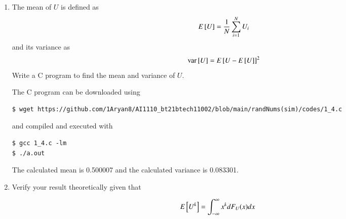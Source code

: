 \documentclass[journal,12pt,twocolumn]{IEEEtran}
\renewcommand\thesection{\arabic{section}}
\begin{document}
\begin{enumerate}[label=\thesection.\arabic*
,ref=\thesection.\theenumi]
\solution
The CDF of $U$ is given by
		\begin{align}
			F_U(x) = \pr{U \leq x} = \int_{-\infty}^{x}p_U(u)du
		\end{align}
We now have three cases:
		\begin{enumerate}
			\item $x < 0$: $p_X(x) = 0$, and hence $F_U(x) = 0$.
			\item $0 \leq x < 1$: Here,
				\begin{align}
					F_U(x) = \int_{0}^{x}du = x
					\label{eq:cdf-uni}
				\end{align}
			\item $x \geq 1$: Put $x = 1$ in \eqref{eq:cdf-uni} as $U$ is uniform in [0, 1] to get $F_U(x) = 1$.
		\end{enumerate}
Therefore,
		\begin{align}
			F_U(x) = 
			\begin{cases}
				0 & x < 0 \\
				x & 0 \leq x < 1 \\
				1 & x \geq 1
			\end{cases}
			\label{eq:cdf-ans}
		\end{align}
This is verified in Figure \eqref{fig:uni_cdf}
\item
The mean of $U$ is defined as
%
\begin{equation}
E{}\left[U\right] = \frac{1}{N}\sum_{i=1}^{N}U_i
	\label{eq:mean-form}
\end{equation}
%
and its variance as
%
\begin{equation}
\text{var}{}\left[U\right] = E{}\left[U- E{}\left[U\right]\right]^2 
	\label{eq:var-form}
\end{equation}
Write a C program to  find the mean and variance of $U$.

\solution
The C program can be downloaded using

\begin{lstlisting}
$ wget https://github.com/1Aryan8/AI1110_bt21btech11002/blob/main/randNums(sim)/codes/1_4.c
\end{lstlisting}
and compiled and executed with
\begin{lstlisting}
$ gcc 1_4.c -lm 
$ ./a.out
\end{lstlisting}
The calculated mean is 0.500007 and the calculated variance is 0.083301.

\item Verify your result theoretically given that
\end{enumerate}
%
\begin{equation}
E{}\left[U^k\right] = \int_{-\infty}^{\infty}x^kdF_{U}(x)dx
\end{equation}
\end{document}
